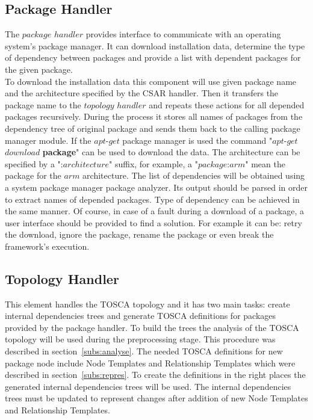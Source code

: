 \subsection{Package Handler} \label{subs:archph}
The $package$ $handler$ provides interface to communicate with an operating system's package manager. 
It can download installation data, determine the type of dependency between packages and provide a list with dependent packages for the given package. \\
To download the installation data this component will use given package name and the architecture specified by the CSAR handler.
Then it transfers the package name to the $topology$ $handler$ and repeats these actions for all depended packages recursively. 
During the process it stores all names of packages from the dependency tree of original package and sends them back to the calling package manager module.
If the $apt$-$get$ package manager is used  the command "$apt$-$get$ $download$ \textbf{package}" can be used to download the data. 
The architecture can be specified by a ":$architecture$" suffix, for example, a "$package$:$arm$" mean the package for the $arm$ architecture.
The list of dependencies will be obtained using a system package manager package analyzer. %
Its output should be parsed in order to extract names of depended packages.
Type of dependency can be achieved in the same manner.
Of course, in case of a fault during a download of a package, a user interface should be provided to find a solution.
For example it can be: retry the download, ignore the package, rename the package or even break the framework's execution.

\subsection{Topology Handler} \label{subs:archtop}
This element handles the TOSCA topology and it has two main tasks: create internal dependencies trees and generate TOSCA definitions for packages provided by the package handler.
To build the trees the analysis of the TOSCA topology will be used during the preprocessing stage.
This procedure was described in section~\ref{subs:analyse}.
The needed TOSCA definitions for new package node include Node Templates and Relationship Templates which were described in section~\ref{subs:repres}.
To create the definitions in the right places the generated internal dependencies trees will be used.
The internal dependencies trees must be updated to represent changes after addition of new Node Templates and Relationship Templates.
